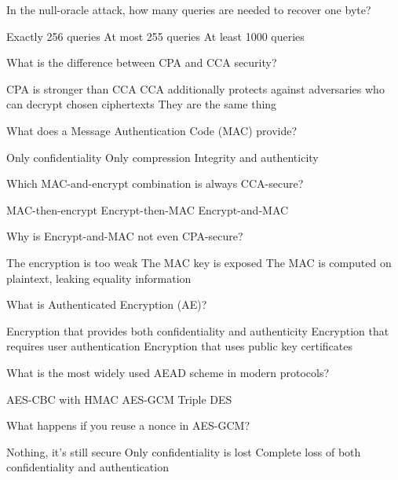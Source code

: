 \documentclass[10pt,a4paper,american]{exam}
\begin{document}
\begin{questions}
	\question In the null-oracle attack, how many queries are needed to recover one byte?
	\begin{randomizechoices}
		\choice Exactly 256 queries
		\CorrectChoice At most 255 queries
		\choice At least 1000 queries
	\end{randomizechoices}

	\question What is the difference between CPA and CCA security?
	\begin{randomizechoices}
		\choice CPA is stronger than CCA
		\CorrectChoice CCA additionally protects against adversaries who can decrypt chosen ciphertexts
		\choice They are the same thing
	\end{randomizechoices}

	\question What does a Message Authentication Code (MAC) provide?
	\begin{randomizechoices}
		\choice Only confidentiality
		\choice Only compression
		\CorrectChoice Integrity and authenticity
	\end{randomizechoices}

	\question Which MAC-and-encrypt combination is always CCA-secure?
	\begin{randomizechoices}
		\choice MAC-then-encrypt
		\CorrectChoice Encrypt-then-MAC
		\choice Encrypt-and-MAC
	\end{randomizechoices}

	\question Why is Encrypt-and-MAC not even CPA-secure?
	\begin{randomizechoices}
		\choice The encryption is too weak
		\choice The MAC key is exposed
		\CorrectChoice The MAC is computed on plaintext, leaking equality information
	\end{randomizechoices}

	\question What is Authenticated Encryption (AE)?
	\begin{randomizechoices}
		\CorrectChoice Encryption that provides both confidentiality and authenticity
		\choice Encryption that requires user authentication
		\choice Encryption that uses public key certificates
	\end{randomizechoices}

	\question What is the most widely used AEAD scheme in modern protocols?
	\begin{randomizechoices}
		\choice AES-CBC with HMAC
		\CorrectChoice AES-GCM
		\choice Triple DES
	\end{randomizechoices}

	\question What happens if you reuse a nonce in AES-GCM?
	\begin{randomizechoices}
		\choice Nothing, it's still secure
		\choice Only confidentiality is lost
		\CorrectChoice Complete loss of both confidentiality and authentication
	\end{randomizechoices}


\end{questions}
\end{document}

